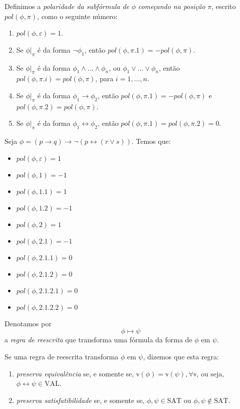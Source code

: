 \begin{definition}
    Definimos a \emph{polaridade da subfórmula de} $\phi$ \emph{começando na posição} $\pi$, escrito $pol(\phi,\pi)$, como o seguinte número:
    \begin{enumerate}
        \item $pol(\phi,\varepsilon) = 1$.
        \item Se $\phi|_\pi$ é da forma $\neg \phi_1$, então $pol(\phi,\pi.1) = -pol(\phi,\pi)$.
        \item Se $\phi|_\pi$ é da forma $\phi_1 \wedge ... \wedge \phi_n$, ou $\phi_1 \vee ... \vee \phi_n$, então $pol(\phi,\pi.i) = pol(\phi,\pi)$, para $i=1,...,n$.
        \item Se $\phi|_\pi$ é da forma $\phi_1 \rightarrow \phi_2$, então $pol(\phi,\pi.1) = -pol(\phi,\pi)$ e $pol(\phi,\pi.2) = pol(\phi,\pi)$.
        \item Se $\phi|_\pi$ é da forma $\phi_1 \leftrightarrow \phi_2$, então $pol(\phi,\pi.1) = pol(\phi,\pi.2) = 0$.
    \end{enumerate}
\end{definition}

\begin{example}
    Seja $\phi = (p \rightarrow q) \rightarrow \neg(p \leftrightarrow (r \vee s))$. Temos que:
    \begin{itemize}
        \item $pol(\phi,\varepsilon) = 1$
        \item $pol(\phi,1) = -1$
        \item $pol(\phi,1.1) = 1$
        \item $pol(\phi,1.2) = -1$
        \item $pol(\phi,2) = 1$
        \item $pol(\phi,2.1) = -1$
        \item $pol(\phi,2.1.1) = 0$
        \item $pol(\phi,2.1.2) = 0$
        \item $pol(\phi,2.1.2.1) = 0$
        \item $pol(\phi,2.1.2.2) = 0$
    \end{itemize}
\end{example}

\begin{definition}
	Denotamos por $$\phi \longmapsto \psi$$ a \emph{regra de reescrita} que transforma uma fórmula da forma de $\phi$ em $\psi$.
	
	Se uma regra de reescrita transforma $\phi$ em $\psi$, dizemos que esta regra:
	\begin{enumerate}
		\item \emph{preserva equivalência} se, e somente se, $\mathbb{v}(\phi) = \mathbb{v}(\psi), \forall \mathbb{v}$, ou seja, $\phi \leftrightarrow \psi \in \text{VAL}$.
		\item \emph{preserva satisfatibilidade} se, e somente se, $\phi,\psi \in \text{SAT}$ ou $\phi,\psi \notin \text{SAT}$.
	\end{enumerate}
\end{definition}

